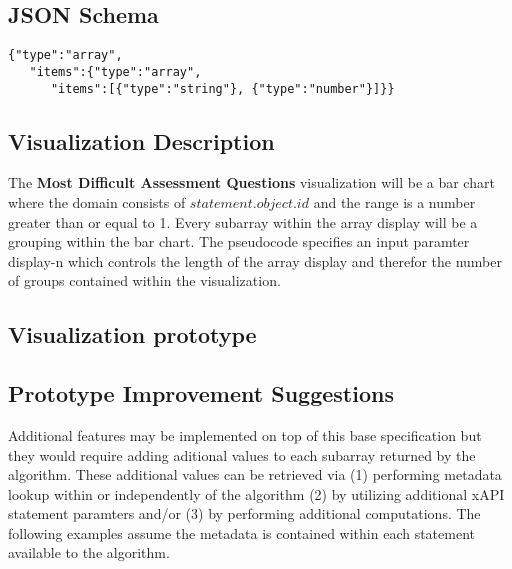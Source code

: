 \documentclass{article}
\begin{document}
\subsection{JSON Schema}

\begin{lstlisting}[style=json]
{"type":"array",
   "items":{"type":"array",
      "items":[{"type":"string"}, {"type":"number"}]}}
\end{lstlisting}

\subsection{Visualization Description}
The \textbf{Most Difficult Assessment Questions} visualization will be
a bar chart where the domain consists of $statement.object.id$ and the
range is a number greater than or equal to 1. Every subarray within
the array display will be a grouping within the bar chart. The
pseudocode specifies an input paramter display-n which controls the
length of the array display and therefor the number of groups contained within
the visualization.


\subsection{Visualization prototype}



\subsection{Prototype Improvement Suggestions}
Additional features may be implemented on top of this base
specification but they would require adding aditional values to each
subarray returned by the algorithm. These additional values can be
retrieved via (1) performing metadata lookup within or independently
of the algorithm (2) by utilizing additional xAPI statement paramters
and/or (3) by performing additional computations. The following
examples assume the metadata is contained within each statement
available to the algorithm.
\end{document}
